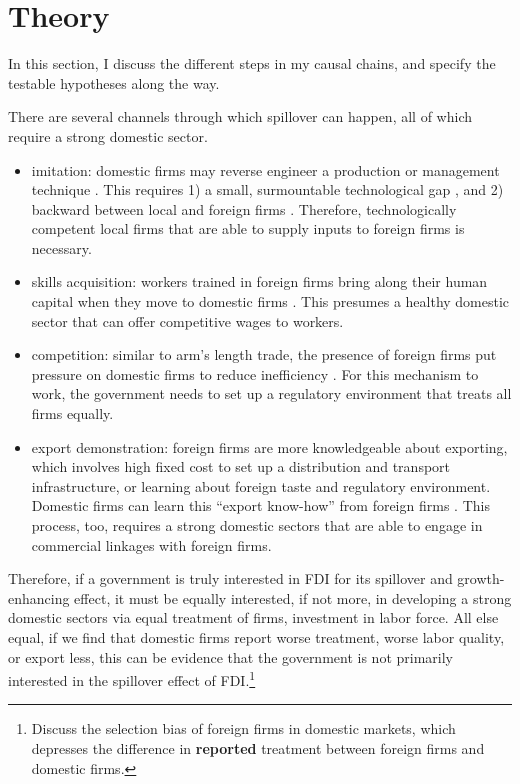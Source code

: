\documentclass[12pt]{article}
\begin{document}
\section{Theory}

In this section, I discuss the different steps in my causal chains, and specify the testable hypotheses along the way.

There are several channels through which spillover can happen, all of which require a strong domestic sector.
\begin{itemize}
	\item imitation:  domestic firms may reverse engineer a production or management technique \citep{Wang1992}. This requires 1) a small, surmountable technological gap \citep{Kokko1996}, and 2) backward between local and foreign firms \citep{Javorcik2004}. Therefore, technologically competent local firms that are able to supply inputs to foreign firms is necessary.
	\item skills acquisition: workers trained in foreign firms bring along their human capital when they move to domestic firms \citep{Djankov2000}. This presumes a healthy domestic sector that can offer competitive wages to workers. 
	\item competition: similar to arm's length trade, the presence of foreign firms put pressure on domestic firms to reduce inefficiency \citep{Glass2002}. For this mechanism to work, the government needs to set up a regulatory environment that treats all firms equally.
	\item export demonstration: foreign firms are more knowledgeable about exporting, which involves high fixed cost to set up a distribution and transport infrastructure, or learning about foreign taste and regulatory environment. Domestic firms can learn this ``export know-how'' from foreign firms \citep{Aitken1997}. This process, too, requires a strong domestic sectors that are able to engage in commercial linkages with foreign firms.
\end{itemize} 

Therefore, if a government is truly interested in FDI for its spillover and growth-enhancing effect, it must be equally interested, if not more, in developing a strong domestic sectors via equal treatment of firms, investment in labor force. All else equal, if we find that domestic firms report worse treatment, worse labor quality, or export less, this can be evidence that the government is not primarily interested in the spillover effect of FDI.\footnote{Discuss the selection bias of foreign firms in domestic markets, which depresses the difference in \textbf{reported} treatment between foreign firms and domestic firms.}
\end{document}
